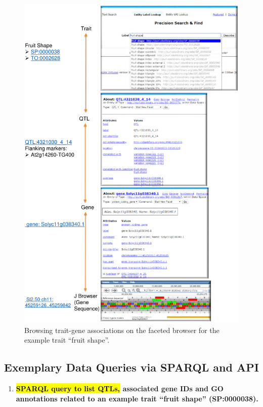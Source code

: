 \documentclass[applsci,article,accept,moreauthors,pdftex]{Definitions/mdpi}
\begin{document}
{\begin{figure}[H]
\centering
\includegraphics[width=\textwidth]{Figure2.pdf}
\caption{Browsing trait-gene associations on the faceted browser for the example trait “fruit shape”.}
\label{Figure2}
\end{figure}

\newpage


\subsection{Exemplary Data Queries via SPARQL and API}

\begin{enumerate}[label=(\Roman*),leftmargin=*,labelsep=0mm]

\item \textbf{\hl{SPARQL query to list QTLs,} %
 associated gene IDs and GO annotations related to an example trait ``fruit shape'' (SP:0000038).}



\end{enumerate}}
\end{document}
